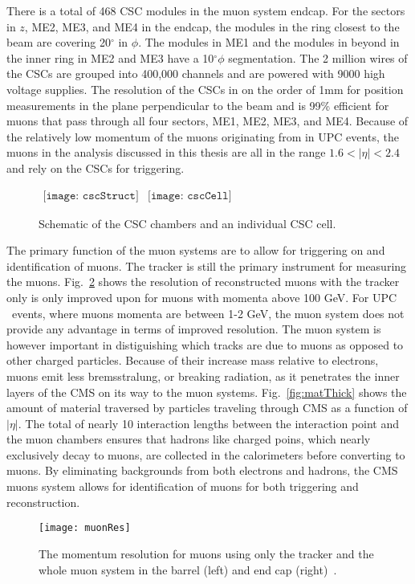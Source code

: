     There is a total of 468 CSC modules in the muon system endcap. 
    For the sectors in $z$, ME2, ME3, and ME4 in the endcap, the modules in 
      the ring closest to the beam are covering 20$^{\circ}$ in $\phi$.
    The modules in ME1 and the modules in beyond in the inner ring in
      ME2 and ME3 have a 10$^{\circ} \phi$ segmentation.
    The 2 million wires of the CSCs are grouped into 400,000 channels and are
      powered with 9000 high voltage supplies. 
    The resolution of the CSCs in on the order of 1mm for position measurements 
      in the plane perpendicular to the beam and is 99\% efficient for muons
      that pass through all four sectors, ME1, ME2, ME3, and ME4.
    Because of the relatively low momentum of the muons originating from \JPsi{}
      in UPC events, the muons in the analysis discussed in this thesis are all
      in the range $1.6 < |\eta| < 2.4$ and rely on the CSCs for triggering. 
    \begin{figure}[!Hhbt]
      \centering
      $ \begin{array}{cc}
        \texttt{[image: cscStruct]} &
        \texttt{[image: cscCell]}
      \end{array} $
      \caption{Schematic of the CSC chambers and an individual CSC cell.}
      \label{fig:cscSchem}
    \end{figure}

    The primary function of the muon systems are to allow for triggering on and
      identification of muons.
    The tracker is still the primary instrument for measuring the muons. 
    Fig.~\ref{fig:muonRes} shows the resolution of reconstructed muons with 
      the tracker only is only improved upon for muons with momenta above 
      100 GeV. 
    For UPC \JPsi{}~events, where muons momenta are between 1-2 GeV, the muon
      system does not provide any advantage in terms of improved resolution.
    The muon system is however important in distiguishing which tracks are 
      due to muons as opposed to other charged particles.
    Because of their increase mass relative to electrons, muons emit less 
      bremsstralung, or breaking radiation, as it penetrates the inner layers
      of the CMS on its way to the muon systems.
    Fig.~\ref{fig:matThick} shows the amount of material traversed by particles
      traveling through CMS as a function of $|\eta|$.
    The total of nearly 10 interaction lengths between the interaction point 
      and the muon chambers ensures that hadrons like charged poins, which
      nearly exclusively decay to muons, are collected in the calorimeters 
      before converting to muons. 
    By eliminating backgrounds from both electrons and hadrons, the CMS muons 
      system allows for identification of muons for both triggering and 
      reconstruction.
    \begin{figure}[!Hhbt]
      \centering
      \texttt{[image: muonRes]}
      \caption{ The momentum resolution for muons using only the 
        tracker and the whole muon system in the barrel (left) and end cap 
        (right)~\cite{tCmsE}.}
      \label{fig:muonRes}
    \end{figure}

